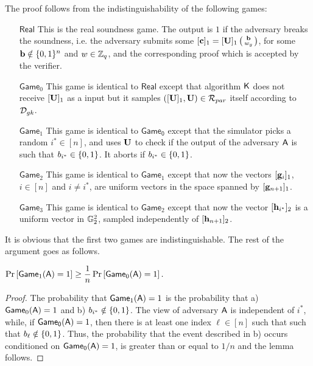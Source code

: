 The proof follows from the indistinguishability of the following games:
\begin{itemize}
\item [$\mathsf{Real}$] This is the real soundness game. 
 The output is $1$ if  the adversary breaks the soundness,
i.e. the adversary submits
some $[\mathbf{c}]_1 = [\mathbf{{U}}]_1\left(\begin{smallmatrix}\mathbf{b}\\ w_g\end{smallmatrix}\right)$, for some
$\mathbf{b}\notin \{0,1\}^n$ and $w \in \mathbb{Z}_q$, and
the corresponding proof which is accepted by the verifier.
\item[$\mathsf{Game}_0$] This game is identical to 
$\mathsf{Real}$ except that algorithm $\mathsf{K}$ does not receive $[\mathbf{{U}}]_1$ as a input but it samples
$([\mathbf{{U}}]_1,\mathbf{{U}}) \in \mathcal{R}_{par}$
itself according to $\mathcal{D}_{{gk}}$.
\item[$\mathsf{Game}_1$] This game is identical to 
$\mathsf{Game_0}$ except that the simulator picks a random $i^* \in [n]$, and uses $\mathbf{{U}}$ to check  
    if the output of the adversary $\mathsf{A}$ is such that 
    $b_{i^*}\in \{0,1\}$.  It aborts if  $b_{i^*}\in \{0,1\}$.
\item[$\mathsf{Game}_{2}$] This game is identical to 
$\mathsf{Game}_1$ except that now the vectors $[\mathbf{g}_{i}]_1$, $i \in [n]$ and $i \neq i^*$,
are uniform vectors in the space spanned by $[\mathbf{g}_{n+1}]_1$.   
\item[$\mathsf{Game}_{3}$] This game is identical to 
$\mathsf{Game}_2$ except that now the vector $[\mathbf{h}_{i^*}]_2$ is 
a uniform vector in $\mathbb{G}_2^2$, sampled independently of 
$[\mathbf{h}_{n+1}]_2$.     
\end{itemize}
It is obvious that the first two games are indistinguishable. 
The rest of the argument goes as follows. 

\begin{lemma} $\Pr\left[ \mathsf{Game}_1(\mathsf{A})=1\right]\geq\dfrac{1}{n}\Pr\left[\mathsf{Game}_0(\mathsf{A})=1\right].$
\label{lemma:bits1}
\end{lemma}

\begin{proof}  The probability that
 $\mathsf{Game}_1(\mathsf{A})=1$ is the probability that  a) $\mathsf{Game}_0(\mathsf{A})=1$ and
b)  $b_{i^*} \notin \{0,1\}$. The view of adversary $\mathsf{A}$ is independent of $i^*$, while, if $\mathsf{Game_0}(\mathsf{A})=1$, then there is at least one index $\ell \in [n]$ such that  
such that  $b_{\ell} \notin \{0,1\}$. Thus, 
the probability that the event described in b) occurs conditioned on $\mathsf{Game_0}(\mathsf{A})=1$, is greater than or equal to $1/n$ and the lemma follows.
\end{proof}

